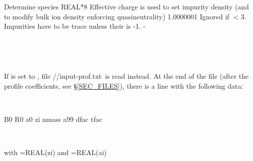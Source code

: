 {Determine species}
{REAL*8}
{Effective charge  is used to set impurity density (and to modify bulk ion density enforcing quasineutrality)}
{1.0000001}
{Ignored if $<$3. Impurities have to be trace unless their  is -1.}
{-}

\

\

If  is set to \true, file {\ttfamily //input-prof.txt}~is read instead. At the end of the file (after the profile coefficients, see \S\ref{SEC_FILES}), there is a line with the following data:

\

{\ttfamily  B0     R0      a0      zi      nmass   a99     dfac    tfac}

\

with ={\ttfamily REAL(zi)} and ={\ttfamily REAL(ai)}%




